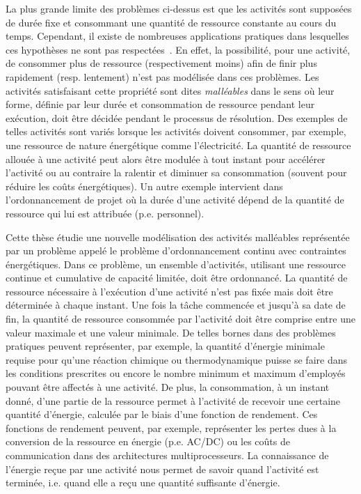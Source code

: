 La plus grande limite des problèmes ci-dessus est que les activités sont
supposées de durée fixe et consommant une quantité de ressource
constante au cours du temps. Cependant, il existe de nombreuses
applications pratiques dans lesquelles ces hypothèses ne sont pas
respectées~\cite{HaitArtiguesLopez,Blaz,W80}. En effet, la
possibilité, pour une activité, de consommer plus de ressource
(respectivement moins) afin de finir plus rapidement (resp. lentement)
n'est pas modélisée dans ces problèmes. Les activités satisfaisant
cette propriété sont dites {\it malléables} dans le sens où leur
forme, définie par leur durée et consommation de ressource pendant
leur exécution, doit être décidée pendant le processus de
résolution. Des exemples de telles activités sont variés lorsque les
activités doivent consommer, par exemple, une ressource de nature 
énergétique comme 
l'électricité.  La quantité de ressource 
allouée à une activité peut alors être modulée à tout instant pour
accélérer l'activité 
ou au contraire la ralentir et diminuer sa consommation (souvent
pour réduire les coûts 
énergétiques). Un autre exemple intervient dans l'ordonnancement de
projet où la durée d'une activité dépend de la quantité de ressource
qui lui est attribuée (p.e. personnel). 

Cette thèse étudie une nouvelle modélisation des activités malléables
représentée par un problème appelé le problème d'ordonnancement
continu avec contraintes énergétiques. Dans ce problème, un ensemble
d'activités,  utilisant une ressource continue et cumulative de
capacité limitée, doit être ordonnancé. La quantité de ressource
nécessaire à l'exécution d'une activité n'est pas fixée mais doit
être déterminée à chaque instant. Une fois la tâche commencée et
jusqu'à sa date de fin, la quantité de ressource consommée par
l'activité doit être comprise entre une valeur maximale et une valeur
minimale. De telles bornes dans des problèmes pratiques
peuvent représenter, par exemple, la quantité d'énergie
minimale requise pour qu'une réaction chimique ou thermodynamique
puisse se faire dans les conditions prescrites ou encore le nombre
minimum et 
maximum d'employés pouvant être affectés à une activité.
De plus, la consommation, à un instant donné, d'une partie
de la ressource permet à l'activité de recevoir une certaine quantité
d'énergie, calculée par le biais d'une fonction de rendement. Ces
fonctions de rendement peuvent, par exemple, représenter les pertes
dues à la conversion de la ressource en énergie (p.e. AC/DC) ou les
coûts de communication dans des architectures multiprocesseurs. 
La connaissance de l'énergie reçue par une activité nous permet de
savoir quand 
l'activité est terminée, i.e. quand elle a reçu une quantité
suffisante d'énergie. 

